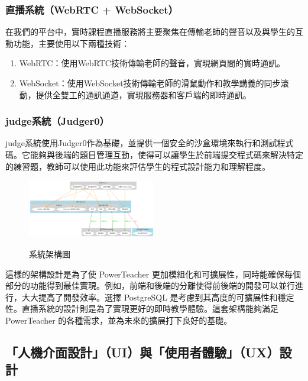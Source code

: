 \documentclass[12pt]{article}
\begin{document}
\subsubsection{直播系統（WebRTC + WebSocket）}
在我們的平台中，實時課程直播服務將主要聚焦在傳輸老師的聲音以及與學生的互動功能，主要使用以下兩種技術：

\begin{enumerate}[label=\textbullet, noitemsep]
  \item WebRTC：使用WebRTC技術傳輸老師的聲音，實現網頁間的實時通訊。
  \item WebSocket：使用WebSocket技術傳輸老師的滑鼠動作和教學講義的同步滾動，提供全雙工的通訊通道，實現服務器和客戶端的即時通訊。
\end{enumerate}

\subsubsection{judge系統（Judger0）}
judge系統使用Judger0作為基礎，並提供一個安全的沙盒環境來執行和測試程式碼。它能夠與後端的題目管理互動，使得可以讓學生於前端提交程式碼來解決特定的練習題，教師可以使用此功能來評估學生的程式設計能力和理解程度。\\

\begin{figure}[htb]
  \centering
  \href{https://raw.githubusercontent.com/programingtw/proglearn-plan/main/img/powerteacherarc.png}{
    \includegraphics[width=0.5\textwidth]{../img/powerteacherarc.png}
  }
  \caption{系統架構圖}
  \label{arc1}            
\end{figure}

這樣的架構設計是為了使 PowerTeacher 更加模組化和可擴展性，同時能確保每個部分的功能得到最佳實現。例如，前端和後端的分離使得前後端的開發可以並行進行，大大提高了開發效率。選擇 PostgreSQL 是考慮到其高度的可擴展性和穩定性。直播系統的設計則是為了實現更好的即時教學體驗。這套架構能夠滿足 PowerTeacher 的各種需求，並為未來的擴展打下良好的基礎。

\subsection{「人機介面設計」（UI）與「使用者體驗」（UX）設計}
\end{document}
